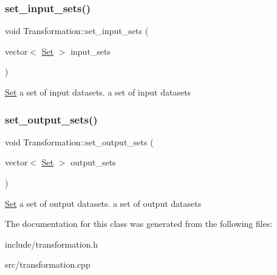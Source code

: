\subsubsection{\texorpdfstring{set\+\_\+input\+\_\+sets()}{set\_input\_sets()}}
{\footnotesize\ttfamily void Transformation\+::set\+\_\+input\+\_\+sets (\begin{DoxyParamCaption}\item[{vector$<$ \hyperlink{classSet}{Set} $>$}]{input\+\_\+sets }\end{DoxyParamCaption})}

\hyperlink{classSet}{Set} a set of input datasets.  a set of input datasets \mbox{\label{classTransformation_a10b3128bcb16deae76746a3179e8e315}} 
\subsubsection{\texorpdfstring{set\+\_\+output\+\_\+sets()}{set\_output\_sets()}}
{\footnotesize\ttfamily void Transformation\+::set\+\_\+output\+\_\+sets (\begin{DoxyParamCaption}\item[{vector$<$ \hyperlink{classSet}{Set} $>$}]{output\+\_\+sets }\end{DoxyParamCaption})}

\hyperlink{classSet}{Set} a set of output datasets.  a set of output datasets 

The documentation for this class was generated from the following files\+:\begin{DoxyCompactItemize}
\item 
include/transformation.\+h\item 
src/transformation.\+cpp\end{DoxyCompactItemize}
